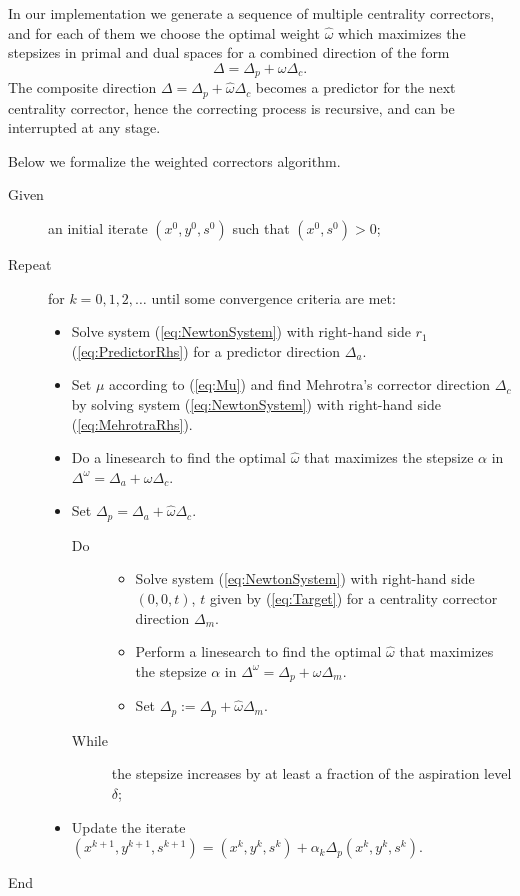 
In our implementation we generate a sequence of multiple centrality 
correctors, and for each of them we choose the optimal weight 
$\hat \omega$ which maximizes the stepsizes in primal and dual spaces 
for a combined direction of the form
\[
  \Delta = \Delta_p + \omega \Delta_c.
\]
The composite direction $\Delta = \Delta_p + \hat \omega \Delta_c$ becomes
a predictor for the next centrality corrector, hence the correcting process
is recursive, and can be interrupted at any stage.

Below we formalize the weighted correctors algorithm.
\begin{description}
\item[Given] an initial iterate $(x^0,y^0,s^0)$ such that $(x^0, s^0) > 0$;
\item[Repeat] for $k=0,1,2,\ldots$ until some convergence criteria are met:
  \begin{itemize}
  \item Solve system (\ref{eq:NewtonSystem}) with right-hand side $r_1$
        (\ref{eq:PredictorRhs}) for a predictor direction $\Delta_a$.

  \item Set $\mu$ according to (\ref{eq:Mu}) and find Mehrotra's corrector 
        direction $\Delta_c$ by solving system (\ref{eq:NewtonSystem}) 
        with right-hand side (\ref{eq:MehrotraRhs}).

  \item Do a linesearch to find the optimal $\hat\omega$ that maximizes 
        the stepsize $\alpha$ in $\Delta^\omega = \Delta_a +\omega\Delta_c$.

  \item Set $\Delta_p = \Delta_a +\hat\omega\Delta_c$. 
    \begin{description}
    \item[Do]
      \begin{itemize}
      \item Solve system (\ref{eq:NewtonSystem}) with right-hand side
	$(0,0,t)$, $t$ given by (\ref{eq:Target}) for a centrality corrector
	direction $\Delta_m$.
      \item Perform a linesearch to find the optimal $\hat\omega$ that maximizes 
        the stepsize $\alpha$ in $\Delta^\omega = \Delta_p +\omega\Delta_m$.
      \item Set $\Delta_p := \Delta_p +\hat\omega\Delta_m$. 
	\end{itemize}
    \item[While] the stepsize increases by at least a fraction of the aspiration level $\delta$;
    \end{description}
  \item Update the iterate $(x^{k+1},y^{k+1},s^{k+1}) = (x^k,y^k,s^k) + \alpha_k\Delta_p (x^k,y^k,s^k).$
  \end{itemize}
\item[End]
\end{description}

